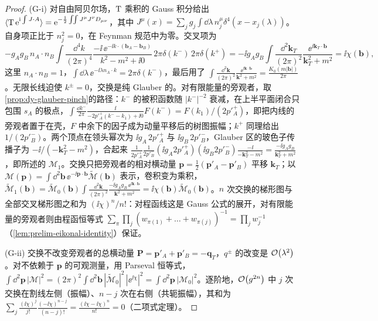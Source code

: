 \begin{proof}
(G-i) 对自由阿贝尔场，${\rm T}$ 乘积的 Gauss 积分给出 $\langle{\rm T}\,\mathrm{e}^{\mathrm{i}\int J\cdot A}\rangle=\mathrm{e}^{-\frac12\int\!\!\int J^\mu J^\nu D_{\mu\nu}}$，其中 $J^\mu(x)=\sum_jg_j\int\dd\lambda\,n_j^\mu\delta^4(x-x_j(\lambda))$。自身项正比于 $n_j^2=0$，在 Feynman 规范中为零。交叉项为
\[
-g_Ag_B\,n_A\cdot n_B\int\frac{\dd^4k}{(2\pi)^4}\frac{-\ii\,\ee^{-\ii k\cdot(\boldsymbol b_A-\boldsymbol b_B)}}{k^2-m^2+\ii0}\,2\pi\delta(k^-)\,2\pi\delta(k^+)
=-\ii g_Ag_B\int\frac{\dd^2\mathbf k_T}{(2\pi)^2}\frac{\ee^{\ii\mathbf k_T\cdot\boldsymbol b}}{\mathbf k_T^2+m^2}=\ii\chi(\boldsymbol b),
\]
这里 $n_A\cdot n_B=1$，$\int\dd\lambda\,\ee^{-\ii\lambda n_A\cdot k}=2\pi\delta(k^-)$，最后用了 $\int\frac{\dd^2\mathbf k}{(2\pi)^2}\frac{\ee^{\ii\mathbf k\cdot\boldsymbol b}}{\mathbf k^2+m^2}=\frac{K_0(m|\boldsymbol b|)}{2\pi}$。无限长线迫使 $k^\pm=0$，交换是纯 Glauber 的。对有限能量的旁观者，取\cref{prop:dy-glauber-pinch}的路径：$k^-$ 的被积函数随 $|k^-|^{-2}$ 衰减，在上半平面闭合只包围 $s_A$ 的极点，$\int\frac{\dd k^-}{2\pi}\frac{\ii}{-2p'^+_A(k^--k_1)+\ii0}F(k^-)=F(k_1)/(2p'^+_A)$，即把内线的旁观者置于在壳，$F$ 中余下的因子成为动量平移后的树图振幅；$k^+$ 同理给出 $1/(2p'^-_B)$。两个顶点在领头幂次为 $\ii g_A\,2p'^+_A$ 与 $\ii g_B\,2p'^-_B$，Glauber 区的玻色子传播子为 $-\ii/(-\mathbf k_T^2-m^2)$，合起来
$\frac{1}{2p'^+_A}\frac{1}{2p'^-_B}(\ii g_A2p'^+_A)(\ii g_B2p'^-_B)\frac{-\ii}{-\mathbf k_T^2-m^2}=\frac{-\ii g_Ag_B}{\mathbf k_T^2+m^2}$，即所述的 $\mathcal M_1$。交换只把旁观者的相对横动量 $\boldsymbol p=\frac12(\mathbf p'_A-\mathbf p'_B)$ 平移 $\mathbf k_T$；以 $\mathcal M(\boldsymbol p)=\int\dd^2\boldsymbol b\,\ee^{-\ii\boldsymbol p\cdot\boldsymbol b}\tilde{\mathcal M}(\boldsymbol b)$ 表示，卷积变为乘积，$\tilde{\mathcal M}_1(\boldsymbol b)=\tilde{\mathcal M}_0(\boldsymbol b)\int\frac{\dd^2\mathbf k}{(2\pi)^2}\frac{-\ii g_Ag_B\,\ee^{\ii\mathbf k\cdot\boldsymbol b}}{\mathbf k^2+m^2}=\ii\chi(\boldsymbol b)\tilde{\mathcal M}_0(\boldsymbol b)$。$n$ 次交换的梯形图与全部交叉梯形图之和为 $(\ii\chi)^n/n!$：对程函线这是 Gauss 公式的展开，对有限能量的旁观者则由程函恒等式 $\sum_{\pi}\prod_j(w_{\pi(1)}+\dots+w_{\pi(j)})^{-1}=\prod_jw_j^{-1}$（\cref{lem:prelim-eikonal-identity}）保证。

(G-ii) 交换不改变旁观者的总横动量 $\boldsymbol P=\mathbf p'_A+\mathbf p'_B=-\mathbf q_T$，$q^\pm$ 的改变是 $\mathcal{O}\!\left(\lambda^2\right)$。对不依赖于 $\boldsymbol p$ 的可观测量，用 Parseval 恒等式，
$\int\dd^2\boldsymbol p\,|\mathcal M|^2=(2\pi)^2\int\dd^2\boldsymbol b\,|\tilde{\mathcal M}_0|^2\,|\ee^{\ii\chi}|^2=\int\dd^2\boldsymbol p\,|\mathcal M_0|^2$。逐阶地，$\mathcal{O}\!\left(g^{2n}\right)$ 中 $j$ 次交换在割线左侧（振幅）、$n-j$ 次在右侧（共轭振幅），其和为 $\sum_j\frac{(\ii\chi)^j}{j!}\frac{(-\ii\chi)^{n-j}}{(n-j)!}=\frac{(\ii\chi-\ii\chi)^n}{n!}=0$（二项式定理）。


\end{proof}
